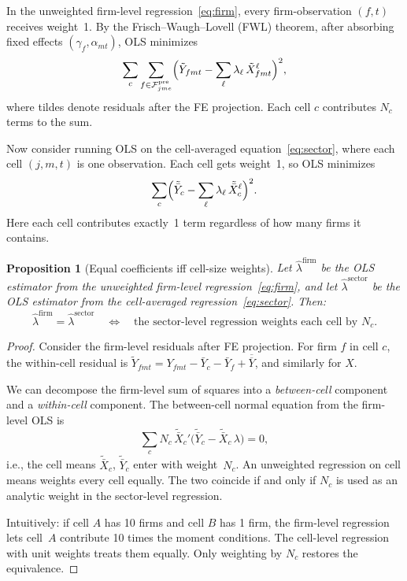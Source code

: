 \documentclass{article}
\newcommand{\cFpre}{\mathcal{F}^{\mathrm{pre}}}
\theoremstyle{plain}
\newtheorem{proposition}{Proposition}
\begin{document}
In the unweighted firm-level regression~\eqref{eq:firm}, every
firm-observation $(f,t)$ receives weight~1.  By the Frisch--Waugh--Lovell
(FWL) theorem, after absorbing fixed effects $(\gamma_f, \alpha_{mt})$, OLS
minimizes
\[
  \sum_c \sum_{f\in\cFpre_{jme}} \Bigl(
    \tilde{Y}_{fmt} - \sum_\ell \lambda_\ell\,\tilde{X}^\ell_{fmt}
  \Bigr)^2,
\]
where tildes denote residuals after the FE projection.  Each cell $c$
contributes $N_c$ terms to the sum.

Now consider running OLS on the cell-averaged equation~\eqref{eq:sector},
where each cell $(j,m,t)$ is one observation.  Each cell gets weight~1, so
OLS minimizes
\[
  \sum_c \Bigl(
    \tilde{\bar{Y}}_c - \sum_\ell \lambda_\ell\,\tilde{\bar{X}}^\ell_c
  \Bigr)^2.
\]
Here each cell contributes exactly~1 term regardless of how many firms it
contains.

\begin{proposition}[Equal coefficients iff cell-size weights]\label{prop:weights}
Let $\hat\lambda^\mathrm{firm}$ be the OLS estimator from the unweighted
firm-level regression~\eqref{eq:firm}, and let $\hat\lambda^\mathrm{sector}$
be the OLS estimator from the cell-averaged regression~\eqref{eq:sector}.
Then:
\[
  \hat\lambda^\mathrm{firm} = \hat\lambda^\mathrm{sector}
  \quad\Longleftrightarrow\quad
  \text{the sector-level regression weights each cell by } N_c.
\]
\end{proposition}

\begin{proof}
Consider the firm-level residuals after FE projection.  For firm $f$ in
cell $c$, the within-cell residual is $\tilde{Y}_{fmt} = Y_{fmt} - \bar{Y}_c
- \bar{Y}_f + \overline{\overline{Y}}$, and similarly for $X$.

We can decompose the firm-level sum of squares into a \emph{between-cell}
component and a \emph{within-cell} component.  The between-cell normal equation
from the firm-level OLS is
\[
  \sum_c N_c \,\tilde{\bar{X}}_c'\bigl(\tilde{\bar{Y}}_c
  - \tilde{\bar{X}}_c\,\lambda\bigr) = 0,
\]
i.e., the cell means $\tilde{\bar{X}}_c$, $\tilde{\bar{Y}}_c$ enter with
weight~$N_c$.  An unweighted regression on cell means weights every cell
equally.  The two coincide if and only if $N_c$ is used as an analytic weight
in the sector-level regression.

Intuitively: if cell $A$ has 10 firms and cell $B$ has 1 firm, the firm-level
regression lets cell~$A$ contribute 10 times the moment conditions.
The cell-level regression with unit weights treats them equally.  Only
weighting by $N_c$ restores the equivalence.
\end{proof}
\end{document}
